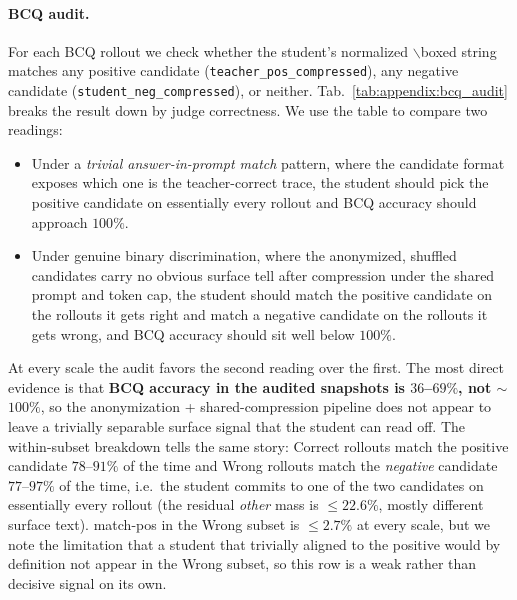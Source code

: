 \documentclass{llmxive}
\begin{document}
\paragraph{BCQ audit.}
For each BCQ rollout we check whether the student's normalized $\backslash$boxed string matches any positive candidate (\texttt{teacher\_pos\_compressed}), any negative candidate (\texttt{student\_neg\_compressed}), or neither. Tab.~\ref{tab:appendix:bcq_audit} breaks the result down by judge correctness. We use the table to compare two readings:
\begin{itemize}[leftmargin=12pt,topsep=2pt,itemsep=2pt]
  \item Under a \emph{trivial answer-in-prompt match} pattern, where the candidate format exposes which one is the teacher-correct trace, the student should pick the positive candidate on essentially every rollout and BCQ accuracy should approach $100\%$.
  \item Under genuine binary discrimination, where the anonymized, shuffled candidates carry no obvious surface tell after compression under the shared prompt and token cap, the student should match the positive candidate on the rollouts it gets right and match a negative candidate on the rollouts it gets wrong, and BCQ accuracy should sit well below $100\%$.
\end{itemize}
At every scale the audit favors the second reading over the first. The most direct evidence is that \textbf{BCQ accuracy in the audited snapshots is $36$--$69\%$, not $\sim$$100\%$}, so the anonymization + shared-compression pipeline does not appear to leave a trivially separable surface signal that the student can read off. The within-subset breakdown tells the same story: Correct rollouts match the positive candidate $78$--$91\%$ of the time and Wrong rollouts match the \emph{negative} candidate $77$--$97\%$ of the time, i.e.\ the student commits to one of the two candidates on essentially every rollout (the residual \emph{other} mass is $\leq\!22.6\%$, mostly different surface text). match-pos in the Wrong subset is $\leq\!2.7\%$ at every scale, but we note the limitation that a student that trivially aligned to the positive would by definition not appear in the Wrong subset, so this row is a weak rather than decisive signal on its own.
\end{document}
